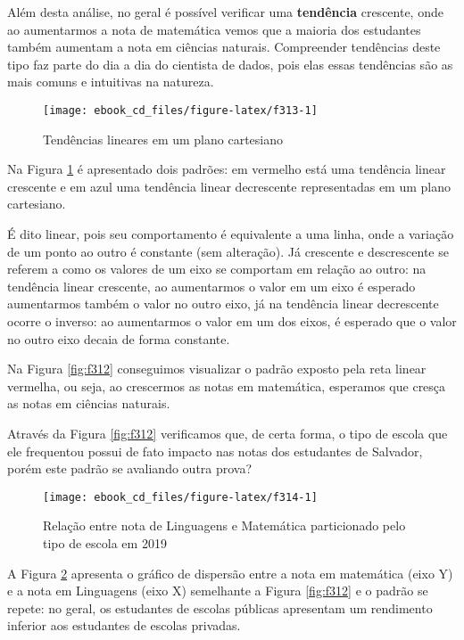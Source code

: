 \documentclass[
  oneside]{book}
\begin{document}
Além desta análise, no geral é possível verificar uma \textbf{tendência} crescente, onde ao aumentarmos a nota de matemática vemos que a maioria dos estudantes também aumentam a nota em ciências naturais. Compreender tendências deste tipo faz parte do dia a dia do cientista de dados, pois elas essas tendências são as mais comuns e intuitivas na natureza.

\begin{figure}

{\centering \texttt{[image: ebook\_cd\_files/figure-latex/f313-1]} 

}

\caption{Tendências lineares em um plano cartesiano}\label{fig:f313}
\end{figure}

Na Figura \ref{fig:f313} é apresentado dois padrões: em vermelho está uma tendência linear crescente e em azul uma tendência linear decrescente representadas em um plano cartesiano.

É dito linear, pois seu comportamento é equivalente a uma linha, onde a variação de um ponto ao outro é constante (sem alteração). Já crescente e descrescente se referem a como os valores de um eixo se comportam em relação ao outro: na tendência linear crescente, ao aumentarmos o valor em um eixo é esperado aumentarmos também o valor no outro eixo, já na tendência linear decrescente ocorre o inverso: ao aumentarmos o valor em um dos eixos, é esperado que o valor no outro eixo decaia de forma constante.

Na Figura \ref{fig:f312} conseguimos visualizar o padrão exposto pela reta linear vermelha, ou seja, ao crescermos as notas em matemática, esperamos que cresça as notas em ciências naturais.

Através da Figura \ref{fig:f312} verificamos que, de certa forma, o tipo de escola que ele frequentou possui de fato impacto nas notas dos estudantes de Salvador, porém este padrão se avaliando outra prova?

\begin{figure}

{\centering \texttt{[image: ebook\_cd\_files/figure-latex/f314-1]} 

}

\caption{Relação entre nota de Linguagens e Matemática particionado pelo tipo de escola em 2019}\label{fig:f314}
\end{figure}

A Figura \ref{fig:f314} apresenta o gráfico de dispersão entre a nota em matemática (eixo Y) e a nota em Linguagens (eixo X) semelhante a Figura \ref{fig:f312} e o padrão se repete: no geral, os estudantes de escolas públicas apresentam um rendimento inferior aos estudantes de escolas privadas.
\end{document}
